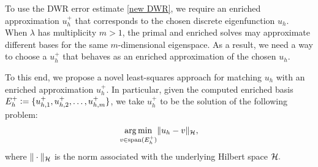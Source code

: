 


To use the DWR error estimate \eqref{new DWR}, we require an enriched approximation $u_h^+$ that corresponds to the chosen discrete eigenfunction $u_h.$ 
When $\lambda$ has multiplicity $m>1$, the primal and enriched solves may approximate different bases for the same $m$-dimensional eigenspace. As a result, we need a way to choose a $u_h^+$ that behaves as an enriched approximation of the chosen $u_h.$ 


To this end, we propose a novel least-squares approach for matching $u_h$ with an enriched approximation $u_h^+.$ In particular,  given the computed enriched basis 
\mbox{$E_h^+ \vcentcolon= \{u_{h,1}^+,u_{h,2}^+,\ldots,u_{h,m}^+\}$},
we take $u_h^+$ to be the solution of the following problem:
\begin{equation}\label{least}
    \underset{v\in \operatorname{span}(E_h^+)}{\arg\min} \|u_h-v\|_{\mathcal{H}},
\end{equation}
where $\|\cdot\|_{\mathcal{H}}$ is the norm associated with the underlying Hilbert space $\mathcal{H}.$



